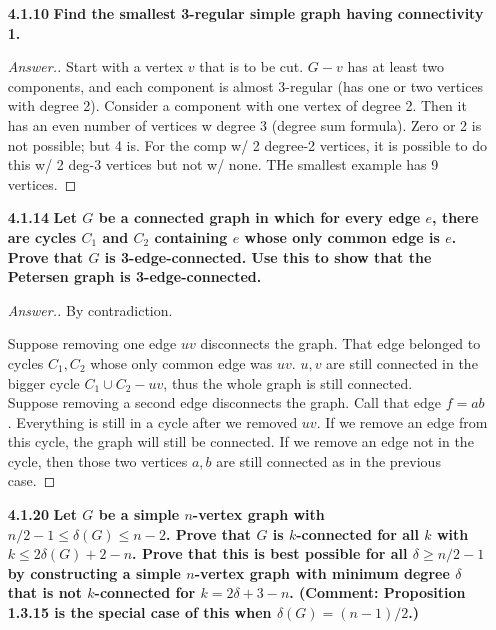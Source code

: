 \documentclass[11pt]{amsart}
\theoremstyle{plain}
\theoremstyle{definition}
\theoremstyle{example}
\begin{document}
\begin{enumerate}[\qquad]
\item[\bf 4.1.10] {\bf Find the smallest 3-regular simple graph having connectivity 1.}\\

\begin{proof}[Answer.]
Start with a vertex $v$ that is to be cut. $G-v$ has at least two components, and each component is almost 3-regular (has one or two vertices with degree 2). Consider a component with one vertex of degree 2. Then it has an even number of vertices w degree 3 (degree sum formula). Zero or 2 is not possible; but 4 is. For the comp w/ 2 degree-2 vertices, it is possible to do this w/ 2 deg-3 vertices but not w/ none. THe smallest example has 9 vertices. 

\end{proof}

\bigskip




\item[\bf 4.1.14] {\bf Let $G$ be a connected graph in which for every edge $e$, there are cycles $C_1$ and $C_2$ containing $e$ whose only common edge is $e$.  Prove that $G$ is 3-edge-connected. Use this to show that the Petersen graph is 3-edge-connected.}\\

\begin{proof}[Answer.] By contradiction.

Suppose removing one edge $uv$ disconnects the graph. That edge belonged to cycles $C_1,C_2$ whose only common edge was $uv$. $u,v$ are still connected in the bigger cycle $C_1\cup C_2 -uv$, thus the whole graph is still connected.
\\

Suppose removing a second edge disconnects the graph. Call that edge $f=ab$. Everything is still in a cycle after we removed $uv$. If we remove an edge from this cycle, the graph will still be connected.  If we remove an edge not in the cycle, then those two vertices $a,b$ are still connected as in the previous case.


\end{proof}

\bigskip




\item[\bf 4.1.20] {\bf Let $G$ be a simple $n$-vertex graph with $n/2 - 1 \leq \delta(G)\leq n-2$. Prove that $G$ is $k$-connected for all $k$ with $k\leq 2\delta(G)+2-n$. Prove that this is best possible for all $\delta\geq n/2-1$ by constructing a simple $n$-vertex graph with minimum degree $\delta$ that is not $k$-connected for $k=2\delta+3-n$. (Comment: Proposition 1.3.15 is the special case of this when $\delta(G) = (n-1)/2$.)
}


\end{enumerate}
\end{document}
